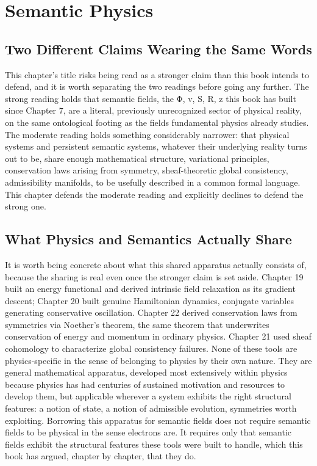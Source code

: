\chapter{Semantic Physics}

\section{Two Different Claims Wearing the Same Words}

This chapter's title risks being read as a stronger claim than this book intends to defend, and it is worth separating the two readings before going any further. The strong reading holds that semantic fields, the Φ, v, S, R, z this book has built since Chapter 7, are a literal, previously unrecognized sector of physical reality, on the same ontological footing as the fields fundamental physics already studies. The moderate reading holds something considerably narrower: that physical systems and persistent semantic systems, whatever their underlying reality turns out to be, share enough mathematical structure, variational principles, conservation laws arising from symmetry, sheaf-theoretic global consistency, admissibility manifolds, to be usefully described in a common formal language. This chapter defends the moderate reading and explicitly declines to defend the strong one.

\section{What Physics and Semantics Actually Share}

It is worth being concrete about what this shared apparatus actually consists of, because the sharing is real even once the stronger claim is set aside. Chapter 19 built an energy functional and derived intrinsic field relaxation as its gradient descent; Chapter 20 built genuine Hamiltonian dynamics, conjugate variables generating conservative oscillation. Chapter 22 derived conservation laws from symmetries via Noether's theorem, the same theorem that underwrites conservation of energy and momentum in ordinary physics. Chapter 21 used sheaf cohomology to characterize global consistency failures. None of these tools are physics-specific in the sense of belonging to physics by their own nature. They are general mathematical apparatus, developed most extensively within physics because physics has had centuries of sustained motivation and resources to develop them, but applicable wherever a system exhibits the right structural features: a notion of state, a notion of admissible evolution, symmetries worth exploiting. Borrowing this apparatus for semantic fields does not require semantic fields to be physical in the sense electrons are. It requires only that semantic fields exhibit the structural features these tools were built to handle, which this book has argued, chapter by chapter, that they do.

